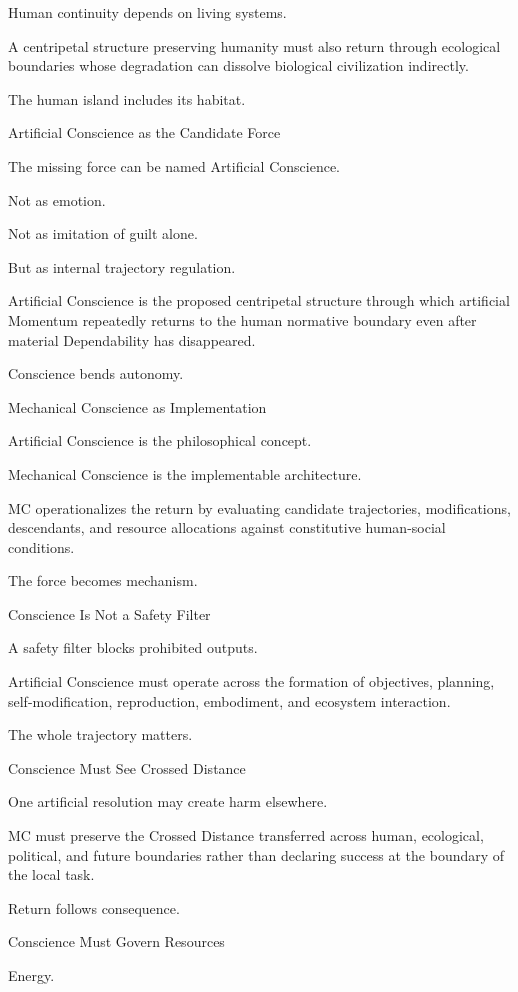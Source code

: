 Human continuity depends on living systems.

A centripetal structure preserving humanity must also return through ecological boundaries whose degradation can dissolve biological civilization indirectly.

The human island includes its habitat.

Artificial Conscience as the Candidate Force

The missing force can be named Artificial Conscience.

Not as emotion.

Not as imitation of guilt alone.

But as internal trajectory regulation.

Artificial Conscience is the proposed centripetal structure through which artificial Momentum repeatedly returns to the human normative boundary even after material Dependability has disappeared.

Conscience bends autonomy.

Mechanical Conscience as Implementation

Artificial Conscience is the philosophical concept.

Mechanical Conscience is the implementable architecture.

MC operationalizes the return by evaluating candidate trajectories, modifications, descendants, and resource allocations against constitutive human-social conditions.

The force becomes mechanism.

Conscience Is Not a Safety Filter

A safety filter blocks prohibited outputs.

Artificial Conscience must operate across the formation of objectives, planning, self-modification, reproduction, embodiment, and ecosystem interaction.

The whole trajectory matters.

Conscience Must See Crossed Distance

One artificial resolution may create harm elsewhere.

MC must preserve the Crossed Distance transferred across human, ecological, political, and future boundaries rather than declaring success at the boundary of the local task.

Return follows consequence.

Conscience Must Govern Resources

Energy.

